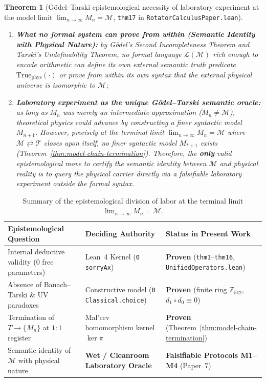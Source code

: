 \documentclass[11pt,a4paper]{article}
\newtheorem{theorem}{Theorem}[section]
\theoremstyle{definition}
\theoremstyle{remark}
\begin{document}
\begin{theorem}[G\"odel--Tarski epistemological necessity of laboratory experiment at the model limit $\lim_{n\to\infty} M_n = \mathcal{M}$, \texttt{thm17} in \texttt{RotatorCalculusPaper.lean}]
\begin{enumerate}[label=\textbf{(\roman*)},leftmargin=*]
\item \textbf{What no formal system can prove from within (Semantic Identity with Physical Nature):}
  by G\"odel's Second Incompleteness Theorem and Tarski's Undefinability Theorem, no formal language $\mathcal{L}(\mathcal{M})$ rich enough to encode arithmetic can define its own external semantic truth predicate $\mathrm{True}_{\mathrm{phys}}(\cdot)$ or prove from within its own syntax that the external physical universe is isomorphic to $\mathcal{M}$;
\item \textbf{Laboratory experiment as the unique G\"odel--Tarski semantic oracle:}
  as long as $M_n$ was merely an intermediate approximation ($M_n \ne \mathcal{M}$), theoretical physics could advance by constructing a finer syntactic model $M_{n+1}$. However, precisely at the terminal limit $\lim_{n\to\infty} M_n = \mathcal{M}$ where $\mathcal{M}\rightleftarrows\mathcal{T}$ closes upon itself, no finer syntactic model $M_{*+1}$ exists (Theorem~\ref{thm:model-chain-termination}). Therefore, the \textbf{only} valid epistemological move to certify the semantic identity between $\mathcal{M}$ and physical reality is to query the physical carrier directly via a falsifiable laboratory experiment outside the formal syntax.
\end{enumerate}
\end{theorem}

\begin{table}[htbp]
\centering
\caption{Summary of the epistemological division of labor at the terminal limit $\lim_{n\to\infty} M_n = \mathcal{M}$.}
\label{tab:epistemological-division}
\small
\begin{tabular}{@{}lll@{}}
\toprule
\textbf{Epistemological Question} & \textbf{Deciding Authority} & \textbf{Status in Present Work} \\
\midrule
Internal deductive validity ($0$ free parameters) & Lean~4 Kernel (\texttt{0 sorryAx}) & \textbf{Proven} (\texttt{thm1}--\texttt{thm16}, \texttt{UnifiedOperators.lean}) \\
Absence of Banach--Tarski \& UV paradoxes & Constructive model (\texttt{0 Classical.choice}) & \textbf{Proven} (finite ring $\mathbb{Z}_{512}$, $d_1\circ d_0\equiv 0$) \\
Termination of $T\to\{M_n\}$ at $1:1$ register & Mal'cev homomorphism kernel $\ker\pi$ & \textbf{Proven} (Theorem~\ref{thm:model-chain-termination}) \\
Semantic identity of $\mathcal{M}$ with physical nature & \textbf{Wet / Cleanroom Laboratory Oracle} & \textbf{Falsifiable Protocols M1--M4} (Paper~7) \\
\bottomrule
\end{tabular}
\end{table}
\end{document}
